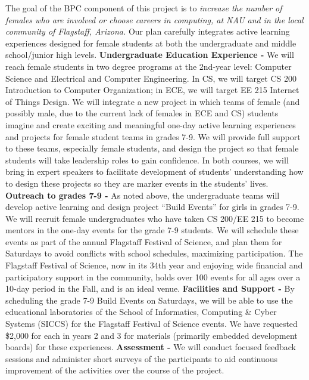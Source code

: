 The goal of the BPC component of this project is to \textit{increase the number of females who are involved or choose careers in computing, at NAU and in the local community of Flagstaff, Arizona.}  Our plan carefully integrates active learning experiences designed for female students at both the undergraduate and middle school/junior high levels.
\textbf{Undergraduate Education Experience -} We will reach female students in two degree programs at the 2nd-year level: Computer Science and Electrical and Computer Engineering. In CS, we will target CS 200 Introduction to Computer Organization; in ECE, we will target EE 215 Internet of Things Design. We will integrate a new project in which teams of female (and possibly male, due to the current lack of females in ECE and CS) students imagine and create exciting and meaningful one-day active learning experiences and projects for female student teams in grades 7-9.  We will provide full support to these teams, especially female students, and design the project so that female students will take leadership roles to gain confidence.  In both courses, we will bring in expert speakers to facilitate development of students’ understanding how to design these projects so they are marker events in the students’ lives. %
\textbf{Outreach to grades 7-9 -} As noted above, the undergraduate teams will develop active learning and design project “Build Events” for girls in grades 7-9. We will recruit female undergraduates who have taken CS 200/EE 215 to become mentors in the one-day events for the grade 7-9 students.  We will schedule these events as part of the annual Flagstaff Festival of Science, and plan them for Saturdays to avoid conflicts with school schedules, maximizing participation. The Flagstaff Festival of Science, now in its 34th year and enjoying wide financial and participatory support in the community, holds over 100 events for all ages over a 10-day period in the Fall, and is an ideal venue.
\textbf{Facilities and Support -} By scheduling the grade 7-9 Build Events on Saturdays, we will be able to use the educational laboratories of the School of Informatics, Computing \& Cyber Systems (SICCS) for the Flagstaff Festival of Science events. We have requested \$2,000 for each in years 2 and 3 for materials (primarily embedded development boards) for these experiences.
\textbf{Assessment -} We will conduct focused feedback sessions and administer short surveys of the participants to aid continuous improvement of the activities over the course of the project.